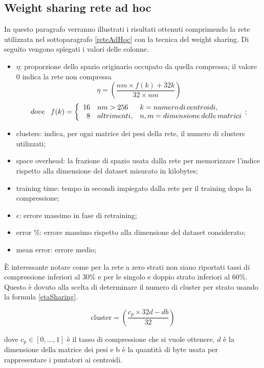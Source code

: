 \documentclass[12pt]{report}
\begin{document}
\subsection{Weight sharing rete ad hoc}
In questo paragrafo verranno illustrati i risultati ottenuti comprimendo la rete utilizzata nel sottoparagrafo \ref{reteAdHoc} con la tecnica del weight sharing.
Di seguito vengono spiegati i valori delle colonne.
\begin{itemize}
\item{$\eta$}: proporzione dello spazio originario occupato da quella compressa; il valore 0 indica la rete non compressa $$\eta=\left(\frac{n m \times f(k) + 32k}{32 \times n m}\right)$$ 
\begin{multline}
$$dove \,\,\,\,\,
f(k) =
\bigg \{
\begin{array}{rl}
16 & nm > 256 \\
8 & altrimenti, \\
\end{array}
\begin{array}{ll}
k = numero\, di\, centroidi, \\
n, m = dimensione\, delle\, matrici
\end{array}
$$;
\end{multline}
\item{clusters}: indica, per ogni matrice dei pesi della rete, il numero di clusters utilizzati;
\item{space overhead}: la frazione di spazio usata dalla rete per memorizzare l'indice rispetto alla dimensione del dataset misurato in kilobytes;
\item{training time}: tempo in secondi impiegato dalla rete per il training dopo la compressione;
\item{$\epsilon$}: errore massimo in fase di retraining;
\item{error \%}: errore massimo rispetto alla dimensione del dataset considerato;
\item{mean error}: errore medio;
\end{itemize}
\par\null\par
È interessante notare come per la rete a zero strati non siano riportati tassi di compressione inferiori al 30\% e per le singolo e doppio strato inferiori al 60\%. Questo è dovuto alla scelta di determinare il numero di cluster per strato usando la formula \eqref{etaSharing}.

\begin{equation}
\mathrm{cluster}=\left(\frac{c_p \times 32d - db}{32}\right)
\label{etaSharing}
\end{equation}
\par\null\par
dove $c_p \in [0,\dots,1]$ è il tasso di compressione che si vuole ottenere, $d$ è la dimensione della matrice dei pesi e b è la quantità di byte usata per rappresentare i puntatori ai centroidi.
\end{document}
